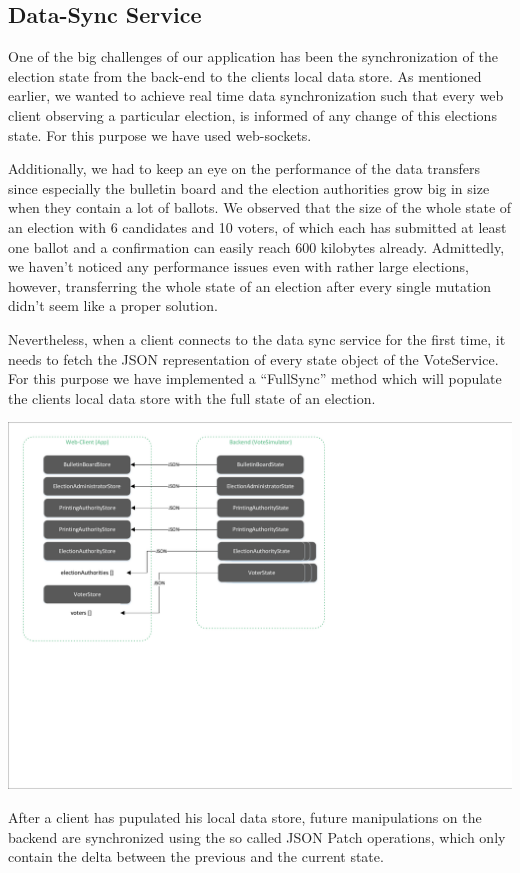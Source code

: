 \subsection{Data-Sync Service}
One of the big challenges of our application has been the synchronization of the election state from the back-end to the clients local data store. As mentioned earlier, we wanted to achieve real time data synchronization such that every web client observing a particular election, is informed of any change of this elections state. For this purpose we have used web-sockets.

Additionally, we had to keep an eye on the performance of the data transfers since especially the bulletin board and the election authorities grow big in size when they contain a lot of ballots. We observed that the size of the whole state of an election with 6 candidates and 10 voters, of which each has submitted at least one ballot and a confirmation can easily reach 600 kilobytes already. Admittedly, we haven't noticed any performance issues even with rather large elections, however, transferring the whole state of an election after every single mutation didn't seem like a proper solution.

Nevertheless, when a client connects to the data sync service for the first time, it needs to fetch the JSON representation of every state object of the VoteService. For this purpose we have implemented a "`FullSync"' method which will populate the clients local data store with the full state of an election.

\begin{center}
\includegraphics[scale=0.62]{assets/datastores.pdf}
\label{Datastores}%
\end{center}
After a client has pupulated his local data store, future manipulations on the backend are synchronized using the so called JSON Patch operations, which only contain the delta between the previous and the current state.

